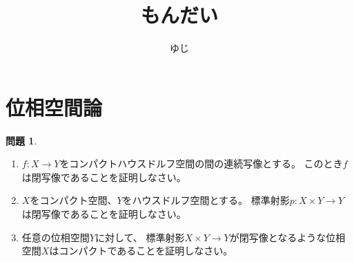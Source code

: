 \documentclass[uplatex]{jsarticle}
\title{もんだい}
\author{ゆじ}
\theoremstyle{definition}
\newtheorem{prob}[prob]{問題}
\begin{document}
\maketitle



\appendix


\newpage
\section{位相空間論}

\renewcommand{\thesection}{\Alph{section}}



\begin{prob}
  \begin{enumerate}
    \item
    \(f:X\to Y\)をコンパクトハウスドルフ空間の間の連続写像とする。
    このとき\(f\)は閉写像であることを証明しなさい。
    \item
    \(X\)をコンパクト空間、\(Y\)をハウスドルフ空間とする。
    標準射影\(p:X\times Y\to Y\)は閉写像であることを証明しなさい。
    \item
    任意の位相空間\(Y\)に対して、
    標準射影\(X\times Y\to Y\)が閉写像となるような位相空間\(X\)はコンパクトであることを証明しなさい。
  \end{enumerate}
\end{prob}
\end{document}
